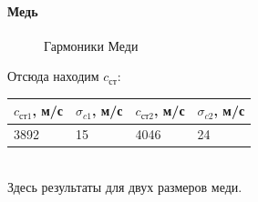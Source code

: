 \documentclass[a4paper, 12pt]{article}%
\begin{document}
\paragraph*{Медь}
\begin{figure}[h!]
\caption{Гармоники Меди}
\end{figure}
Отсюда находим $c_{\text{ст}}$:
\begin{table}[h]
\begin{tabular}{|l|l|l|l|}
\hline
$c_{\text{ст1}}$, м/с & $\sigma_{c1}$, м/с & $c_{\text{ст2}}$, м/с & $\sigma_{c2}$, м/с \\ \hline
3892                  & 15                  & 4046                  & 24 \\ \hline
\end{tabular}
\end{table}
\\
Здесь результаты для двух размеров меди.
\end{document}
